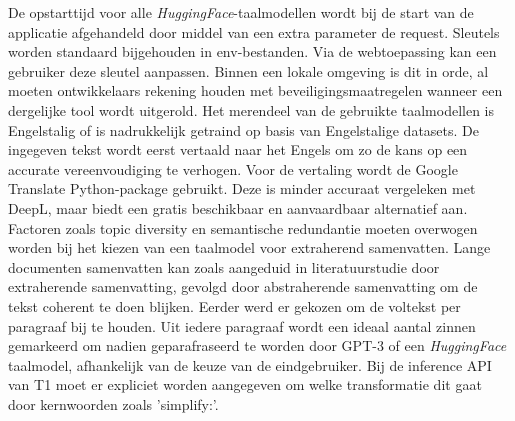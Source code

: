 De opstarttijd voor alle \textit{HuggingFace}-taalmodellen wordt bij de start van de applicatie afgehandeld door middel van een extra parameter de request. Sleutels worden standaard bijgehouden in env-bestanden. Via de webtoepassing kan een gebruiker deze sleutel aanpassen. Binnen een lokale omgeving is dit in orde, al moeten ontwikkelaars rekening houden met beveiligingsmaatregelen wanneer een dergelijke tool wordt uitgerold. Het merendeel van de gebruikte taalmodellen is Engelstalig of is nadrukkelijk getraind op basis van Engelstalige datasets. De ingegeven tekst wordt eerst vertaald naar het Engels om zo de kans op een accurate vereenvoudiging te verhogen. Voor de vertaling wordt de Google Translate Python-package gebruikt. Deze is minder accuraat vergeleken met DeepL, maar biedt een gratis beschikbaar en aanvaardbaar alternatief aan. Factoren zoals topic diversity en semantische redundantie moeten overwogen worden bij het kiezen van een taalmodel voor extraherend samenvatten. Lange documenten samenvatten kan zoals aangeduid in literatuurstudie door extraherende samenvatting, gevolgd door abstraherende samenvatting om de tekst coherent te doen blijken. Eerder werd er gekozen om de voltekst per paragraaf bij te houden. Uit iedere paragraaf wordt een ideaal aantal zinnen gemarkeerd om nadien geparafraseerd te worden door GPT-3 of een \textit{HuggingFace} taalmodel, afhankelijk van de keuze van de eindgebruiker. Bij de inference API van T1 moet er expliciet worden aangegeven om welke transformatie dit gaat door kernwoorden zoals 'simplify:'.

\medspace

